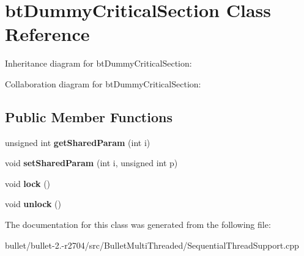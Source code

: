 \hypertarget{classbt_dummy_critical_section}{\section{bt\+Dummy\+Critical\+Section Class Reference}
\label{classbt_dummy_critical_section}
}


Inheritance diagram for bt\+Dummy\+Critical\+Section\+:


Collaboration diagram for bt\+Dummy\+Critical\+Section\+:
\subsection*{Public Member Functions}
\begin{DoxyCompactItemize}
\item 
\hypertarget{classbt_dummy_critical_section_adf954732171d1a3d6fe984a47c13bf65}{unsigned int {\bfseries get\+Shared\+Param} (int i)}\label{classbt_dummy_critical_section_adf954732171d1a3d6fe984a47c13bf65}

\item 
\hypertarget{classbt_dummy_critical_section_aa4630ed1f2cd498b273b01ac0169600d}{void {\bfseries set\+Shared\+Param} (int i, unsigned int p)}\label{classbt_dummy_critical_section_aa4630ed1f2cd498b273b01ac0169600d}

\item 
\hypertarget{classbt_dummy_critical_section_ae62728d00d0d78f33f513463a72a6432}{void {\bfseries lock} ()}\label{classbt_dummy_critical_section_ae62728d00d0d78f33f513463a72a6432}

\item 
\hypertarget{classbt_dummy_critical_section_a1d262d8244f3040e06ac904a30b6553c}{void {\bfseries unlock} ()}\label{classbt_dummy_critical_section_a1d262d8244f3040e06ac904a30b6553c}

\end{DoxyCompactItemize}


The documentation for this class was generated from the following file\+:\begin{DoxyCompactItemize}
\item 
bullet/bullet-\/2.-\/r2704/src/\+Bullet\+Multi\+Threaded/Sequential\+Thread\+Support.\+cpp\end{DoxyCompactItemize}
